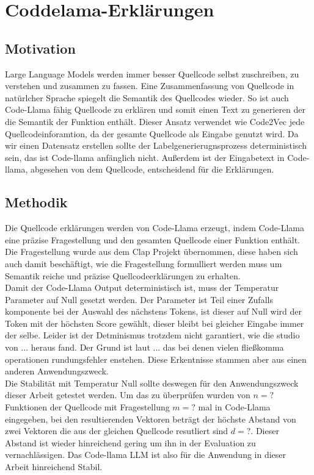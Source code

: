 \documentclass[12pt,letterpaper,ngerman]{article}
\begin{document}
\section{Coddelama-Erklärungen}
\subsection{Motivation}
Large Language Models werden immer besser Quellcode selbst zuschreiben,
zu verstehen und zusammen zu fassen. Eine Zusammenfassung von Quellcode
in natürlcher Sprache spiegelt die Semantik des Quellcodes wieder. So ist
auch Code-Llama fähig Quellcode zu erklären und somit einen Text zu generieren
der die Semantik der Funktion enthält. Dieser Ansatz verwendet wie Code2Vec
jede Quellcodeinforamtion, da der gesamte Quellcode als Eingabe genutzt wird.
Da wir einen Datensatz erstellen sollte der Labelgenerierugnsprozess 
deterministisch sein, das ist Code-llama anfänglich nicht. Außerdem ist der
Eingabetext in Code-llama, abgesehen von dem Quellcode, entscheidend für die 
Erklärungen.

\subsection{Methodik}
Die Quellcode erklärungen werden von Code-Llama erzeugt, indem Code-Llama
eine präzise Fragestellung und den gesamten Quellcode einer Funktion enthält.
Die Fragestellung wurde aus dem Clap Projekt übernommen, diese haben sich
auch damit beschäftigt, wie die Fragestellung formulliert werden muss
um Semantik reiche und präzise Quellcodeerklärungen zu erhalten. \\
Damit
der Code-Llama Output deterministisch ist, muss der Temperatur Parameter
auf Null gesetzt werden. Der Parameter ist Teil einer Zufalls komponente
bei der Auswahl des nächstens Tokens, ist dieser auf Null wird der Token
mit der höchsten Score gewählt, dieser bleibt bei gleicher Eingabe immer
der selbe. Leider ist der Detminismus trotzdem nicht garantiert, wie die
studio von ... heraus fand. Der Grund ist laut ... das bei denen vielen
fließkomma operationen rundungsfehler enstehen. Diese Erkentnisse stammen
aber aus einen anderen Anwendungszweck.\\
Die Stabilität mit Temperatur Null sollte deswegen für den Anwendungszweck
dieser Arbeit getestet werden.
Um das zu überprüfen wurden von $n = ?$ Funktionen der Quellcode mit Fragestellung
$m = ?$ mal in Code-Llama eingegeben, bei den resultierenden Vektoren beträgt der 
höchste Abstand von zwei Vektoren die aus der gleichen Quellcode resutliert
sind $d = ?$. Dieser Abstand ist wieder hinreichend gering um ihn in der Evaluation
zu vernachlässigen. Das Code-llama LLM ist also für die Anwendung in
dieser Arbeit hinreichend Stabil.
\end{document}
